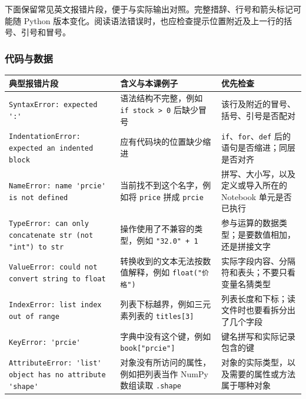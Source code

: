 \documentclass[UTF8,a4paper,11pt,fontset=fandol]{ctexart}
\providecommand{\passthrough}[1]{#1}
\begin{document}
下面保留常见英文报错片段，便于与实际输出对照。完整措辞、行号和箭头标记可能随 Python 版本变化。阅读语法错误时，也应检查提示位置附近及上一行的括号、引号和冒号。

\subsubsection{代码与数据}\label{ux4ee3ux7801ux4e0eux6570ux636e}

\begin{longtable}[]{@{}
  >{\raggedright\arraybackslash}p{}
  >{\raggedright\arraybackslash}p{}
  >{\raggedright\arraybackslash}p{}@{}}
\toprule\noalign{}
\begin{minipage}[b]{\linewidth}\raggedright
典型报错片段
\end{minipage} & \begin{minipage}[b]{\linewidth}\raggedright
含义与本课例子
\end{minipage} & \begin{minipage}[b]{\linewidth}\raggedright
优先检查
\end{minipage} \\
\midrule\noalign{}
\endhead
\bottomrule\noalign{}
\endlastfoot
\passthrough{\lstinline!SyntaxError: expected ':'!} & 语法结构不完整，例如 \passthrough{\lstinline!if stock > 0!} 后缺少冒号 & 该行及附近的冒号、括号、引号是否配对 \\
\passthrough{\lstinline!IndentationError: expected an indented block!} & 应有代码块的位置缺少缩进 & \passthrough{\lstinline!if!}、\passthrough{\lstinline!for!}、\passthrough{\lstinline!def!} 后的语句是否缩进；同层是否对齐 \\
\passthrough{\lstinline!NameError: name 'prcie' is not defined!} & 当前找不到这个名字，例如将 \passthrough{\lstinline!price!} 拼成 \passthrough{\lstinline!prcie!} & 拼写、大小写，以及定义或导入所在的 Notebook 单元是否已执行 \\
\passthrough{\lstinline!TypeError: can only concatenate str (not "int") to str!} & 操作使用了不兼容的类型，例如 \passthrough{\lstinline!"32.0" + 1!} & 参与运算的数据类型；是要数值相加，还是拼接文字 \\
\passthrough{\lstinline!ValueError: could not convert string to float!} & 转换收到的文本无法按数值解释，例如 \passthrough{\lstinline!float("价格")!} & 实际字段内容、分隔符和表头；不要只看变量名猜类型 \\
\passthrough{\lstinline!IndexError: list index out of range!} & 列表下标越界，例如三元素列表的 \passthrough{\lstinline!titles[3]!} & 列表长度和下标；读文件时也要看拆分出了几个字段 \\
\passthrough{\lstinline!KeyError: 'prcie'!} & 字典中没有这个键，例如 \passthrough{\lstinline!book["prcie"]!} & 键名拼写和实际记录包含的键 \\
\passthrough{\lstinline!AttributeError: 'list' object has no attribute 'shape'!} & 对象没有所访问的属性，例如把列表当作 NumPy 数组读取 \passthrough{\lstinline!.shape!} & 对象的实际类型，以及需要的属性或方法属于哪种对象 \\
\end{longtable}
\end{document}
